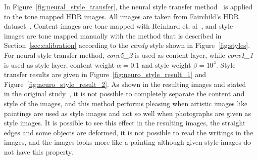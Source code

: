 In Figure~\ref{fig:neural_style_transfer}, the neural style transfer method~\cite{gatys2016image} is applied to the tone mapped HDR images. All images are taken from Fairchild's HDR dataset~\cite{fairchild2007hdr}. Content images are tone mapped with Reinhard et. al~\cite{reinhard2002photographic}, and style images are tone mapped manually with the method that is described in Section~\ref{sec:calibration} according to the \emph{candy} style shown in Figure~\ref{fig:styles}. For neural style transfer method, \emph{conv5\_2} is used as content layer, while \emph{conv1\_1} is used as style layer, content weight $\alpha = 0.1$ and style weight $\beta = 10^4$. Style transfer results are given in Figure~\ref{fig:neuro_style_result_1} and Figure~\ref{fig:neuro_style_result_2}. As shown in the resulting images and stated in the original study~\cite{gatys2016image}, it is not possible to completely separate the content and style of the images, and this method performs pleasing when artistic images like paintings are used as style images and not so well when photographs are given as style images. It is possible to see this effect in the resulting images, the straight edges and some objects are deformed, it is not possible to read the writings in the images, and the images looks more like a painting although given style images do not have this property.

